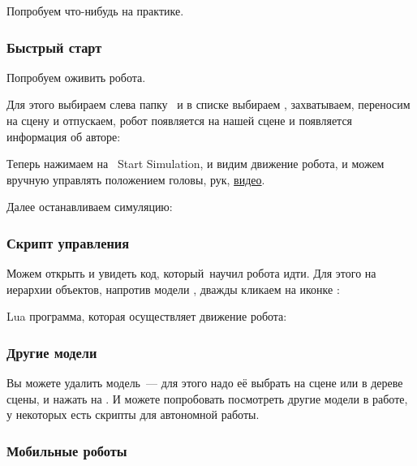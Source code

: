 Попробуем что-нибудь на практике.

\subsubsection{Быстрый старт}

Попробуем оживить робота.

Для этого выбираем слева папку \ и в списке выбираем 
, захватываем, переносим на сцену и отпускаем, робот появляется 
на нашей сцене и появляется информация об авторе:


Теперь нажимаем на \keys{\rms}\ Start Simulation, и видим движение робота, и 
можем вручную управлять положением головы, рук, \href{https://vimeo.com/122517749}{видео}.

Далее останавливаем симуляцию:


\subsubsection{Скрипт управления}

Можем открыть и увидеть код, который\ научил робота идти. Для этого на иерархии объектов, напротив модели 
, дважды кликаем на иконке :


Lua программа, которая осуществляет движение робота:


\subsubsection{Другие модели}

Вы можете удалить модель\ --- для этого надо её выбрать на сцене или в дереве
сцены, и нажать на . И можете попробовать посмотреть другие модели
в работе, у некоторых есть скрипты для автономной работы.

\subsubsection{Мобильные роботы}


